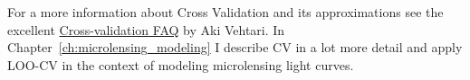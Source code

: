\documentclass[12pt,dvipsnames]{report}
\newcommand{\ud}{\,\mathrm{d}}
\renewcommand{\vec}[1]{\boldsymbol{\mathbf{#1}}}
\begin{document}
For a more information about Cross Validation and its approximations see the excellent
\href{https://avehtari.github.io/modelselection/CV-FAQ.html}{Cross-validation FAQ}
by Aki Vehtari.
In Chapter~\ref{ch:microlensing_modeling} I describe CV in a lot more detail and apply
LOO-CV in the context of modeling microlensing light curves.


%
%
\end{document}
